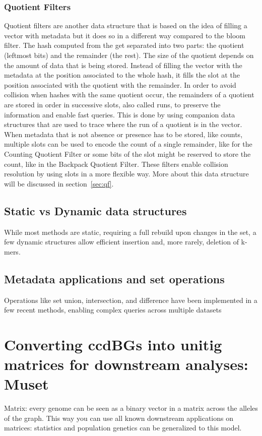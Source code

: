 \subsubsection{Quotient Filters}
Quotient filters are another data structure that is based on the idea of filling a vector with metadata but it does so in a different way compared to the bloom filter.
The hash computed from the \kmer get separated into two parts: the quotient (leftmost bits) and the remainder (the rest). The size of the quotient depends on the amount of data that is being stored. Instead of filling the vector with the metadata at the position associated to the whole hash, it fills the slot at the position associated with the quotient with the remainder. In order to avoid collision when hashes with the same quotient occur, the remainders of a quotient are stored in order in successive slots, also called runs, to preserve the information and enable fast queries. This is done by using companion data structures that are used to trace where the run of a quotient is in the vector. When metadata that is not absence or presence has to be stored, like counts, multiple slots can be used to encode the count of a single remainder, like for the Counting Quotient Filter or some bits of the slot might be reserved to store the count, like in the Backpack Quotient Filter.
These filters enable collision resolution by using slots in a more flexible way. More about this data structure will be discussed in section~\ref{sec:qf}.
\subsection{Static vs Dynamic data structures}
While most methods are static, requiring a full rebuild upon changes in the \kmer set, a few dynamic structures allow efficient insertion and, more rarely, deletion of k-mers.

\subsection{Metadata applications and set operations}
Operations like set union, intersection, and difference have been implemented in a few recent methods, enabling complex queries across multiple datasets


\section{Converting ccdBGs into unitig matrices for downstream analyses: Muset}
Matrix: every genome can be seen as a binary vector in a matrix across the alleles of the graph. This way you can use all known downstream applications on matrices: statistics and population genetics can be generalized to this model.

